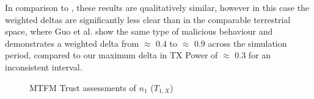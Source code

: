 \documentclass[conference]{IEEEtran}
\providecommand{\DIFaddbegin}{} %
\providecommand{\DIFaddend}{} %
\begin{document}
In comparison to \cite{Guo11}, these results are qualitatively similar, however in this case the weighted deltas are significantly less clear than in the comparable terrestrial space, where Guo et al. show the same type of malicious behaviour and demonstrates a weighted delta from $\approx$ 0.4 to $\approx$ 0.9 across the simulation period, compared to our maximum delta in TX Power of $\approx$ 0.3 for an inconsistent interval.
%
\begin{figure}[h]
  \centering
  \newline
  \caption{MTFM Trust assessments of $n_1$ ($T_{1,X}$)\protect\footnotemark} 
  \label{fig:trust_mobility}
\end{figure}
\DIFaddbegin {}
\DIFaddend %
\end{document}
